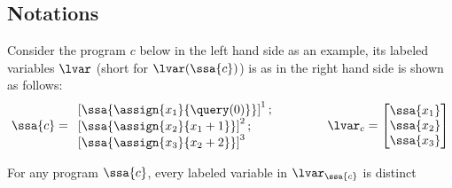 \subsection{Notations}
%
\label{subsec:alg_notation}
%
Consider the program $c$ below in the left hand side as an example, its labeled variables $\lvar$ (short for $\lvar(\ssa{c})$) is as in the right hand side is shown as follows:
$$
\ssa{c} = 
\begin{array}{l}
\left[\ssa{\assign {x_1} {\query(0)}}		\right]^1;
\\
\left[\ssa{\assign {x_2} {x_1 + 1}}		\right]^2;
\\
\left[\ssa{\assign {x_3} {x_2 + 2}}		\right]^3
\end{array}
~~~~~~~~~~~~
\lvar_c = \left [ 
\begin{matrix}
\ssa{x_1} \\
\ssa{x_2} \\
\ssa{x_3} \\
\end{matrix} \right ]
$$
%
\begin{lem}
For any program $\ssa{c}$, every labeled variable in $\lvar_\ssa{c}$ is distinct
\end{lem}
%

